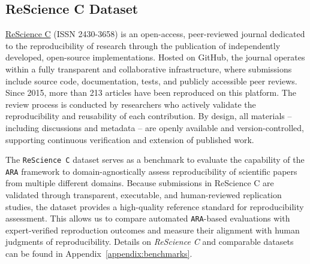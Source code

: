 \documentclass{article}
\begin{document}

\subsection{ReScience C Dataset}

\href{https://rescience.github.io/}{ReScience C} (ISSN 2430-3658) is an open-access, peer-reviewed journal dedicated to the reproducibility of research through the publication of independently developed, open-source implementations. 
Hosted on GitHub, the journal operates within a fully transparent and collaborative infrastructure, where submissions include source code, documentation, tests, and publicly accessible peer reviews. 
Since 2015, more than 213 articles have been reproduced on this platform.
The review process is conducted by researchers who actively validate the reproducibility and reusability of each contribution. 
By design, all materials -- including discussions and metadata -- are openly available and version-controlled, supporting continuous verification and extension of published work. 

The \texttt{ReScience C} dataset serves as a benchmark to evaluate the capability of the \texttt{ARA} framework to domain-agnostically assess reproducibility of scientific papers from multiple different domains.
Because submissions in ReScience C are validated through transparent, executable, and human-reviewed replication studies, the dataset provides a high-quality reference standard for reproducibility assessment.
This allows us to compare automated \texttt{ARA}-based evaluations with expert-verified reproduction outcomes and measure their alignment with human judgments of reproducibility. Details on \textit{ReScience C} and comparable datasets can be found in Appendix~\ref{appendix:benchmarks}.





    


\end{document}
